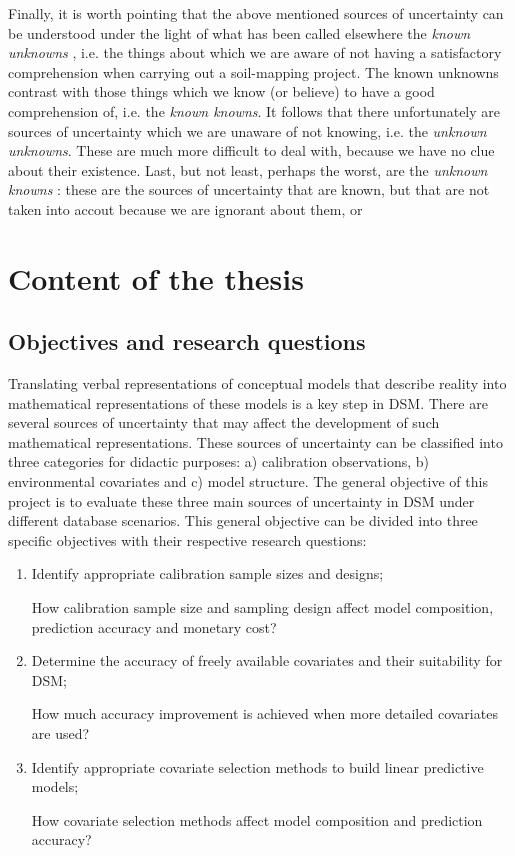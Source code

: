 Finally, it is worth pointing that the above mentioned sources of uncertainty can be understood 
under the light of what has been called elsewhere the \textit{known unknowns} \citep{Wikipedia2015},
i.e. the things about which we are aware of not having a satisfactory comprehension when carrying 
out a soil-mapping project. The known unknowns contrast with those things which we know (or 
believe) to have a good comprehension of, i.e. the \textit{known knowns}. It follows that there 
unfortunately are sources of uncertainty which we are unaware of not knowing, i.e. the 
\textit{unknown unknowns}. These are much more difficult to deal with, because we have no clue about
their existence. Last, but not least, perhaps the worst, are the \textit{unknown knowns} 
\citep{Zizek2006}: these are the sources of uncertainty that are known, but that are not taken
into accout because we are ignorant about them, or 

\section{Content of the thesis}

\subsection{Objectives and research questions}



Translating verbal representations of conceptual models that describe reality 
into mathematical representations of these models is a key step in DSM. There 
are several sources of uncertainty that may affect the development of such 
mathematical representations. These sources of uncertainty can be classified 
into three categories for didactic purposes: a) calibration observations, b) 
environmental covariates and c) model structure. The general objective of this 
project is to evaluate these three main sources of uncertainty in DSM under 
different database scenarios. This general objective can be divided into three 
specific objectives with their respective research questions:

\begin{enumerate}
  \item Identify appropriate calibration sample sizes and designs;

   How calibration sample size and sampling 
  design affect model composition, prediction accuracy and monetary cost?

  \item Determine the accuracy of freely available covariates and their 
  suitability for DSM;

   How much accuracy improvement is achieved 
  when more detailed covariates are used?

  \item Identify appropriate covariate selection methods to build linear 
  predictive models;

   How covariate selection methods affect model 
  composition and prediction accuracy?
\end{enumerate}

